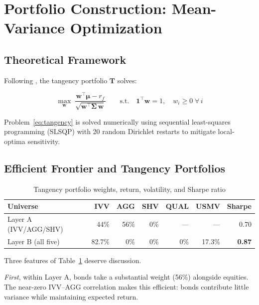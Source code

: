 \documentclass[12pt, letterpaper]{article}
\newcommand{\T}{\mathbf{T}}          %
\newcommand{\w}{\mathbf{w}}          %
\newcommand{\muv}{\boldsymbol{\mu}}  %
\newcommand{\Sig}{\boldsymbol{\Sigma}} %
\newcommand{\rf}{r_f}                %
\begin{document}
\section{Portfolio Construction: Mean-Variance Optimization}
\label{sec:optimization}

\subsection{Theoretical Framework}

Following \citet{markowitz1952}, the tangency portfolio $\T$ solves:

\begin{equation}
  \max_{\w}\; \frac{\w^\top\muv - \rf}{\sqrt{\w^\top \Sig\, \w}}
  \qquad \text{s.t.} \quad
  \mathbf{1}^\top\w = 1,\quad w_i \geq 0\;\forall\, i
  \label{eq:tangency}
\end{equation}

Problem~\eqref{eq:tangency} is solved numerically using sequential
least-squares programming (SLSQP) with 20 random Dirichlet restarts to
mitigate local-optima sensitivity.

\subsection{Efficient Frontier and Tangency Portfolios}

\begin{table}[H]
  \centering
  \caption{Tangency portfolio weights, return, volatility, and Sharpe ratio}
  \label{tab:tangency}
  \begin{tabular}{lrrrrrr}
    \toprule
    \textbf{Universe} & \textbf{IVV} & \textbf{AGG} & \textbf{SHV}
                      & \textbf{QUAL} & \textbf{USMV}
                      & \textbf{Sharpe} \\
    \midrule
    Layer A (IVV/AGG/SHV) & 44\%  & 56\%  & 0\%  & ---  & ---  & 0.70 \\
    Layer B (all five)    & 82.7\%&  0\%  & 0\%  & 0\%  & 17.3\%& \textbf{0.87} \\
    \bottomrule
  \end{tabular}
\end{table}

Three features of Table~\ref{tab:tangency} deserve discussion.

\textit{First}, within Layer A, bonds take a substantial weight (56\%) alongside equities.
The near-zero IVV--AGG correlation makes this efficient: bonds contribute little
variance while maintaining expected return.
\end{document}
